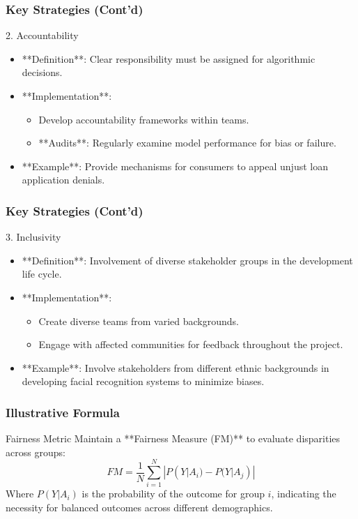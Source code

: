 \documentclass[aspectratio=169]{beamer}
\begin{document}
\begin{frame}[fragile]
    \frametitle{Key Strategies (Cont'd)}
    \begin{block}{2. Accountability}
        \begin{itemize}
            \item **Definition**: Clear responsibility must be assigned for algorithmic decisions.
            \item **Implementation**:
                \begin{itemize}
                    \item Develop accountability frameworks within teams.
                    \item **Audits**: Regularly examine model performance for bias or failure.
                \end{itemize}
            \item **Example**: Provide mechanisms for consumers to appeal unjust loan application denials.
        \end{itemize}
    \end{block}
\end{frame}

\begin{frame}[fragile]
    \frametitle{Key Strategies (Cont'd)}
    \begin{block}{3. Inclusivity}
        \begin{itemize}
            \item **Definition**: Involvement of diverse stakeholder groups in the development life cycle.
            \item **Implementation**:
                \begin{itemize}
                    \item Create diverse teams from varied backgrounds.
                    \item Engage with affected communities for feedback throughout the project.
                \end{itemize}
            \item **Example**: Involve stakeholders from different ethnic backgrounds in developing facial recognition systems to minimize biases.
        \end{itemize}
    \end{block}
\end{frame}

\begin{frame}[fragile]
    \frametitle{Illustrative Formula}
    \begin{block}{Fairness Metric}
        Maintain a **Fairness Measure (FM)** to evaluate disparities across groups:
        \begin{equation}
            FM = \frac{1}{N} \sum_{i=1}^{N} |P(Y|A_i) - P(Y|A_j)|
        \end{equation}
        Where \(P(Y|A_i)\) is the probability of the outcome for group \(i\), indicating the necessity for balanced outcomes across different demographics.
    \end{block}
\end{frame}
\end{document}
